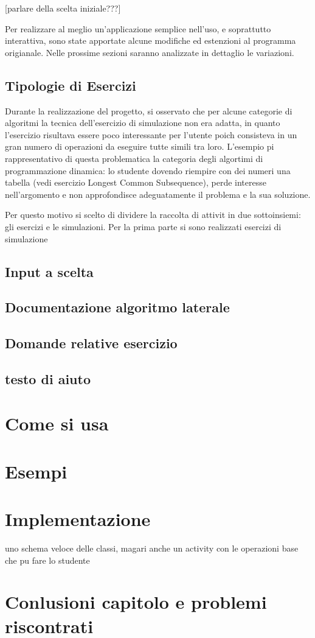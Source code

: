 {[}parlare della scelta iniziale???{]}

Per realizzare al meglio un'applicazione semplice nell'uso, e soprattutto
interattiva, sono state apportate alcune modifiche ed estenzioni al
programma origianale. Nelle prossime sezioni saranno analizzate in
dettaglio le variazioni.


\subsection{Tipologie di Esercizi}

Durante la realizzazione del progetto, si  osservato che per alcune
categorie di algoritmi la tecnica dell'esercizio di simulazione non
era adatta, in quanto l'esercizio risultava essere poco interessante
per l'utente poich consisteva in un gran numero di operazioni da
eseguire tutte simili tra loro. L'esempio pi rappresentativo di questa
problematica  la categoria degli algortimi di programmazione dinamica:
lo studente dovendo riempire con dei numeri una tabella (vedi esercizio
Longest Common Subsequence), perde interesse nell'argomento e non
approfondisce adeguatamente il problema e la sua soluzione.

Per questo motivo si  scelto di dividere la raccolta di attivit
in due sottoinsiemi: gli esercizi e le simulazioni. Per la prima parte
si sono realizzati esercizi di simulazione 


\subsection{Input a scelta}


\subsection{Documentazione algoritmo laterale}


\subsection{Domande relative esercizio}


\subsection{testo di aiuto}


\section{\label{sec:Come-si-usa}Come si usa}


\section{\label{sec:Esempi}Esempi}


\section{Implementazione}

uno schema veloce delle classi, magari anche un activity con le operazioni
base che pu fare lo studente


\section{Conlusioni capitolo e problemi riscontrati}
